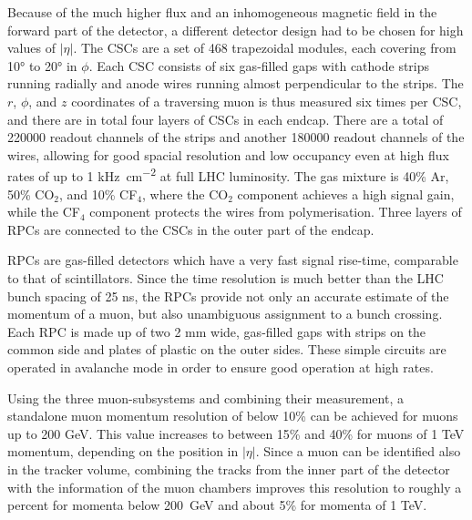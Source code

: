 Because of the much higher flux and an inhomogeneous magnetic field in the forward part of the detector, a different detector design had to be chosen for high values of $|\eta|$.
The CSCs are a set of 468 trapezoidal modules, each covering from \ang{10} to \ang{20} in $\phi$. Each CSC consists of six gas-filled gaps with cathode strips running radially
and anode wires running almost perpendicular to the strips. The $r$, $\phi$, and $z$ coordinates of a traversing muon is thus measured six times per CSC, and there
are in total four layers of CSCs in each endcap. There are a total of \num{220000} readout channels of the strips and another \num{180000} readout channels of the wires,
allowing for good spacial resolution and low occupancy even at high flux rates of up to 1 \si{\kilo\hertz\per\square\centi\meter} at full LHC luminosity. The gas mixture
is 40\% Ar, 50\% CO$_2$, and 10\% CF$_4$, where the CO$_2$ component achieves a high signal gain, while the CF$_4$ component protects the wires from polymerisation. Three
layers of RPCs are connected to the CSCs in the outer part of the endcap.

RPCs are gas-filled detectors which have a very fast signal rise-time, comparable to that of scintillators. Since the time resolution is much better
than the LHC bunch spacing of 25 \si{\nano\second}, the RPCs provide not only an accurate estimate of the momentum of a muon, but also unambiguous
assignment to a bunch crossing. Each RPC is made up of two 2 \si{\milli\meter} wide, gas-filled gaps with strips on the common side and plates of plastic on the outer sides. These 
simple circuits are operated in avalanche mode in order to ensure good operation at high rates.

Using the three muon-subsystems and combining their measurement, a standalone muon momentum resolution of below 10\% can be achieved for muons up to 200 GeV. This value increases
to between 15\% and 40\% for muons of 1 TeV momentum, depending on the position in $|\eta|$. Since a muon can be identified also in the tracker volume, 
combining the tracks from the inner part of the detector with the information of the muon chambers improves this resolution to roughly a percent for momenta below 200~GeV and
about 5\% for momenta of 1 TeV.
